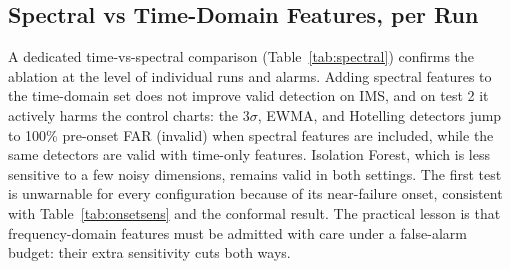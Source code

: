 \documentclass[IJPHM, 2026, 0]{PHMSociety}
\begin{document}
\subsection{Spectral vs Time-Domain Features, per Run}
A dedicated time-vs-spectral comparison (Table~\ref{tab:spectral}) confirms the ablation at the level of individual runs and alarms. Adding spectral features to the time-domain set does not improve valid detection on IMS, and on test 2 it actively harms the control charts: the $3\sigma$, EWMA, and Hotelling detectors jump to 100\% pre-onset FAR (invalid) when spectral features are included, while the same detectors are valid with time-only features. Isolation Forest, which is less sensitive to a few noisy dimensions, remains valid in both settings. The first test is unwarnable for every configuration because of its near-failure onset, consistent with Table~\ref{tab:onsetsens} and the conformal result. The practical lesson is that frequency-domain features must be admitted with care under a false-alarm budget: their extra sensitivity cuts both ways.
\end{document}
